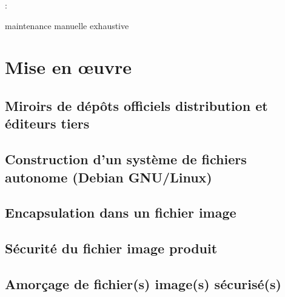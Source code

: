 :
\begin{itmz}
\item{\ml{}
{maintenance manuelle exhaustive}}
\end{itmz}

\ml
{\section{\todo}}
{\section{Mise en œuvre}}

\ml
{\subsection{\todo}}
{\subsection{Miroirs de dépôts officiels distribution et éditeurs tiers}}

\ml
{\subsection{\todo}}
{\subsection{Construction d’un système de fichiers autonome (Debian GNU/Linux)}}

\ml
{\subsection{\todo}}
{\subsection{Encapsulation dans un fichier image}}

\ml
{\subsection{\todo}}
{\subsection{Sécurité du fichier image produit}}

\ml
{\subsection{\todo}}
{\subsection{Amorçage de fichier(s) image(s) sécurisé(s)}}

